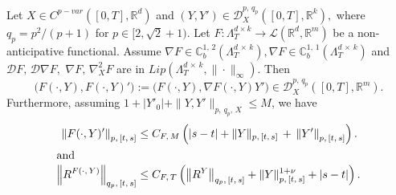 \documentclass[AHL,Unicode,longabstracts,published]{cedram}
\newcommand{\scrD}{\mathscr{D}}
\newcommand{\bbC}{\mathbb{C}}
\newcommand{\calD}{\mathcal{D}}
\newcommand{\calL}{\mathcal{L}}
\newcommand{\Rr}{{\mathbb{R}}}
\begin{document}
\begin{theo}\label{chp3theorem:actiononpaths}
Let $X\in C^{p-var}([0,T],\Rr^d)$ and $(Y,Y')\in \scrD^{p,\,q_p}_{X}([0,T],\Rr^k),$ where $q_p=p^2/(p+1)$ for $p\in [2, \sqrt{2}+1)$.
Let $F\colon \Lambda^{d\times k}_T\to \calL(\Rr^d,\Rr^m)$ be a non-anticipative functional. Assume $\nabla F\in \bbC^{1,\,2}_b(\Lambda^{d\,\times\,k}_T), \nabla F\in \bbC^{1,\,1}_b(\Lambda^{d\,\times\,k}_T)$ and $\calD F,\, \calD\nabla F,$ $\nabla F,\, \nabla^2_{X} F$ are in $Lip(\Lambda^{d\,\times\,k}_T, \|\cdot\|_{\infty})$. Then
\[
\big(F(\cdot,Y), F(\cdot,Y)'\big):=\big(F(\cdot,Y),\nabla F(\cdot,Y)Y'\big)\in \scrD^{p,\,q_p}_{X}\left([0,T],\Rr^m\right).
\]
Furthermore, assuming $1+|Y'_0|+\|Y,Y'\|_{p,\,q_p,\,X}\leq M$, we have
\begin{align*}
\left\|F(\cdot, Y)'\right\|_{p,\,[t,\,s]}&\leq C_{F,\,M}\left(|s-t|+\|Y\|_{p,\,[t,\,s]}\, +\, \left\|Y'\right\|_{p,\,[t,\,s]}\right).
\\
\intertext{and}
\left\|R^{F(\cdot,\,Y)}\right\|_{q_p,\,[t,\,s]}
&\leq C_{F,\,T}\left(
\left\|R^Y\right\|_{q_p,\,[t,\,s]}+ \|Y\|_{p,\, [t,\,s]}^{1+\nu}+|s-t|\right).
\end{align*}
\end{theo}
\end{document}
